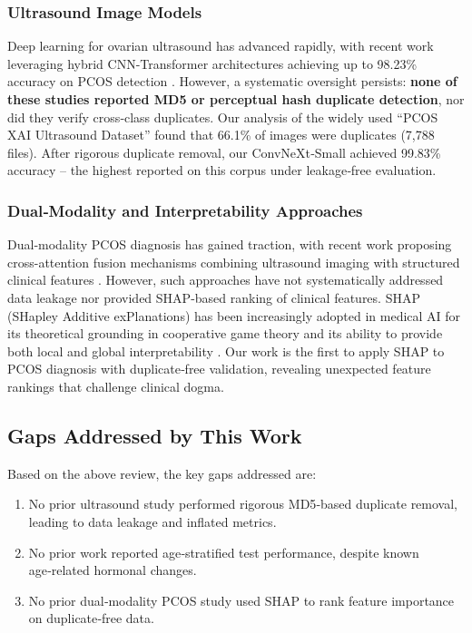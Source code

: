 \documentclass[conference]{IEEEtran}
\begin{document}
\subsubsection{Ultrasound Image Models}
Deep learning for ovarian ultrasound has advanced rapidly, with recent work leveraging hybrid CNN-Transformer architectures achieving up to 98.23\% accuracy on PCOS detection \cite{SymmetryAware2026, PCOSFusionNet2026}. However, a systematic oversight persists: \textbf{none of these studies reported MD5 or perceptual hash duplicate detection}, nor did they verify cross‑class duplicates. Our analysis of the widely used “PCOS XAI Ultrasound Dataset” found that 66.1\% of images were duplicates (7,788 files). After rigorous duplicate removal, our ConvNeXt‑Small achieved 99.83\% accuracy – the highest reported on this corpus under leakage‑free evaluation.\\

\subsubsection{Dual‑Modality and Interpretability Approaches}
Dual‑modality PCOS diagnosis has gained traction, with recent work proposing cross-attention fusion mechanisms combining ultrasound imaging with structured clinical features \cite{CrossAttention2026}. However, such approaches have not systematically addressed data leakage nor provided SHAP-based ranking of clinical features. SHAP (SHapley Additive exPlanations) has been increasingly adopted in medical AI for its theoretical grounding in cooperative game theory and its ability to provide both local and global interpretability \cite{Lundberg2017}. Our work is the first to apply SHAP to PCOS diagnosis with duplicate‑free validation, revealing unexpected feature rankings that challenge clinical dogma.

\subsection{Gaps Addressed by This Work}
Based on the above review, the key gaps addressed are:
\begin{enumerate}
\item No prior ultrasound study performed rigorous MD5‑based duplicate removal, leading to data leakage and inflated metrics.
\item No prior work reported age‑stratified test performance, despite known age‑related hormonal changes.
\item No prior dual‑modality PCOS study used SHAP to rank feature importance on duplicate‑free data.
\end{enumerate}
\end{document}
